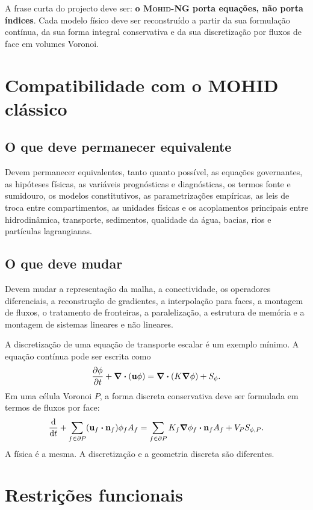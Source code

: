 \documentclass[11pt,a4paper]{article}
\newcommand{\mohidng}{\textsc{Mohid-NG}}
\begin{document}
A frase curta do projecto deve ser: \textbf{o \mohidng{} porta equações, não porta índices}. Cada modelo físico deve ser reconstruído a partir da sua formulação contínua, da sua forma integral conservativa e da sua discretização por fluxos de face em volumes Voronoi.

\section{Compatibilidade com o MOHID clássico}

\subsection{O que deve permanecer equivalente}

Devem permanecer equivalentes, tanto quanto possível, as equações governantes, as hipóteses físicas, as variáveis prognósticas e diagnósticas, os termos fonte e sumidouro, os modelos constitutivos, as parametrizações empíricas, as leis de troca entre compartimentos, as unidades físicas e os acoplamentos principais entre hidrodinâmica, transporte, sedimentos, qualidade da água, bacias, rios e partículas lagrangianas.

\subsection{O que deve mudar}

Devem mudar a representação da malha, a conectividade, os operadores diferenciais, a reconstrução de gradientes, a interpolação para faces, a montagem de fluxos, o tratamento de fronteiras, a paralelização, a estrutura de memória e a montagem de sistemas lineares e não lineares.

A discretização de uma equação de transporte escalar é um exemplo mínimo. A equação contínua pode ser escrita como
\[
\pdv{\phi}{t} + \div(\vb{u}\phi) = \div\left(K\grad\phi\right) + S_\phi.
\]
Em uma célula Voronoi \(P\), a forma discreta conservativa deve ser formulada em termos de fluxos por face:
\[
\dv{}{t}(V_P\phi_P) + \sum_{f\in\partial P} (\vb{u}_f\vdot\vb{n}_f)\phi_f A_f = \sum_{f\in\partial P} K_f \grad\phi_f\vdot\vb{n}_f A_f + V_P S_{\phi,P}.
\]
A física é a mesma. A discretização e a geometria discreta são diferentes.

\section{Restrições funcionais}
\end{document}
